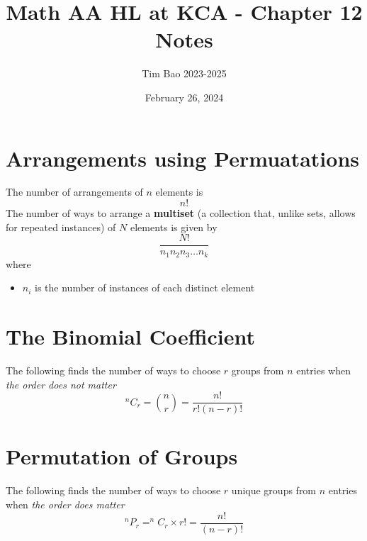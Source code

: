 \documentclass[11pt]{article}
\title{Math AA HL at KCA - Chapter 12 Notes}
\author{Tim Bao 2023-2025}
\date{February 26, 2024}
\begin{document}
\maketitle
\pagebreak
\tableofcontents
\pagebreak

\section{Arrangements using Permuatations}

The number of arrangements of $n$ elements is
$$n!$$
The number of ways to arrange a \textbf{multiset} (a collection that, unlike sets, allows for repeated instances) of $N$ elements is given by $$\frac{N!}{n_1n_2n_3\dots n_k}$$
where
\begin{itemize}
  \item $n_i$ is the number of instances of each distinct element
\end{itemize}


\section{The Binomial Coefficient}

The following finds the number of ways to choose $r$ groups from $n$ entries when \textit{the order does not matter}
$$^{n}C_{r} = {n \choose r} = \frac{n!}{r!(n-r)!}$$

\section{Permutation of Groups}

The following finds the number of ways to choose $r$ unique groups from $n$ entries when \textit{the order does matter}
$$^{n}P_{r} = ^{n}C_{r} \times r! = \frac{n!}{(n-r)!}$$
\end{document}
